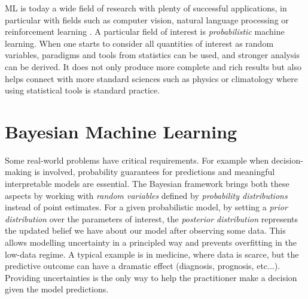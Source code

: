 

\ifpdf
    \graphicspath{{chapters/1_introduction/figures/}}
\else
    \graphicspath{{1_introduction/figures/EPS/}{1_introduction/figures/}}
\fi

\ac{ML} is today a wide field of research with plenty of successful applications, in particular with fields such as computer vision, natural language processing or reinforcement learning \needcite.
A particular field of interest is \textit{probabilistic} machine learning.
When one starts to consider all quantities of interest as random variables, paradigms and tools from statistics can be used, and stronger analysis can be derived.
It does not only produce more complete and rich results but also helps connect with more standard sciences such as physics or climatology where using statistical tools is standard practice.

\section{Bayesian Machine Learning}

Some real-world problems have critical requirements.
For example when decision-making is involved, probability guarantees for predictions and meaningful interpretable models are essential.
The Bayesian framework brings both these aspects by working with \textit{random variables} defined by \textit{probability distributions} instead of point estimates.
For a given probabilistic model, by setting a \textit{prior distribution} over the parameters of interest, the \textit{posterior distribution} represents the updated belief we have about our model after observing some data.
This allows modelling uncertainty in a principled way and prevents overfitting in the low-data regime.\needcite
A typical example is in medicine, where data is scarce, but the predictive outcome can have a dramatic effect (diagnosis, prognosis, etc...).
Providing uncertainties is the only way to help the practitioner make a decision given the model predictions.

